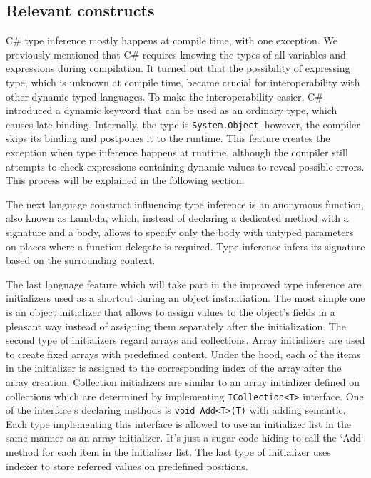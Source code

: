 \subsection{Relevant constructs}

C\# type inference mostly happens at compile time, with one exception. 
We previously mentioned that C\# requires knowing the types of all variables and expressions during compilation. 
It turned out that the possibility of expressing type, which is unknown at compile time, became crucial for interoperability with other dynamic typed languages. 
To make the interoperability easier, C\# introduced a dynamic keyword that can be used as an ordinary type, which causes late binding. 
Internally, the type is \texttt{System.Object}, however, the compiler skips its binding and postpones it to the runtime. 
This feature creates the exception when type inference happens at runtime, although the compiler still attempts to check expressions containing dynamic values to reveal possible errors. 
This process will be explained in the following section.
\par
{}
The next language construct influencing type inference is an anonymous function, also known as Lambda, which, instead of declaring a dedicated method with a signature and a body, allows to specify only the body with untyped parameters on places where a function delegate is required. 
Type inference infers its signature based on the surrounding context.
\par
{}
The last language feature which will take part in the improved type inference are initializers used as a shortcut during an object instantiation.
The most simple one is an object initializer that allows to assign values to the object's fields in a pleasant way instead of assigning them separately after the initialization.
The second type of initializers regard arrays and collections.
Array initializers are used to create fixed arrays with predefined content.
Under the hood, each of the items in the initializer is assigned to the corresponding index of the array after the array creation.
Collection initializers are similar to an array initializer defined on collections which are determined by implementing \texttt{ICollection<T>} interface.
One of the interface's declaring methods is \texttt{void Add<T>(T)} with adding semantic.
Each type implementing this interface is allowed to use an initializer list in the same manner as an array initializer.
It's just a sugar code hiding to call the `Add` method for each item in the initializer list.
The last type of initializer uses indexer to store referred values on predefined positions.

